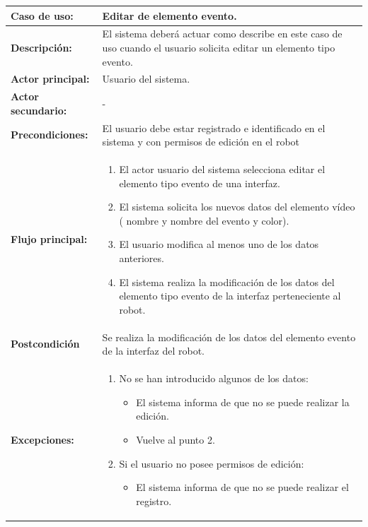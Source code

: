 \begin{table}[H]
  \begin{center}
    \begin{tabular}{|p{3.5cm}|p{10cm}|}
      \hline
      {\textbf{Caso de uso:}} & { Editar de elemento evento.} \\
      \hline
      {\textbf{Descripción:}} & { El sistema deberá actuar como describe en este caso de uso cuando el usuario solicita editar un elemento tipo evento.} \\
     \hline
      {\textbf{Actor principal:}} & { Usuario del sistema.} \\
      \hline
      {\textbf{Actor secundario:}} & { - } \\
      \hline
      {\textbf{Precondiciones:}} & { El usuario debe estar registrado e identificado en el sistema y con permisos de edición en el robot} \\
     \hline   
    {\textbf{Flujo principal:}} & { 
      \begin{enumerate}
	\item El actor usuario del sistema selecciona editar el elemento tipo evento de una interfaz.
	\item El sistema solicita los nuevos datos del elemento vídeo ( nombre y nombre del evento y color).
	\item El usuario modifica al menos uno de los datos anteriores.
	\item El sistema realiza la modificación de los datos del elemento tipo evento de la interfaz perteneciente al robot.
      \end{enumerate}
      } \\
     \hline
     {\textbf{Postcondición}} & {Se realiza la modificación de los datos del elemento evento de la interfaz del robot.}\\
     \hline
      {\textbf{Excepciones:}} & {
	\begin{enumerate}
	\item No se han introducido algunos de los datos:
	\begin{itemize}
	  \item El sistema informa de que no se puede realizar la edición.
	  \item Vuelve al punto 2.
	\end{itemize}
	\item Si el usuario no posee permisos de edición:
	  \begin{itemize}
	    \item El sistema informa de que no se puede realizar el registro.

\end{itemize}
\end{enumerate}}
\end{tabular}
\end{center}
\end{table}
